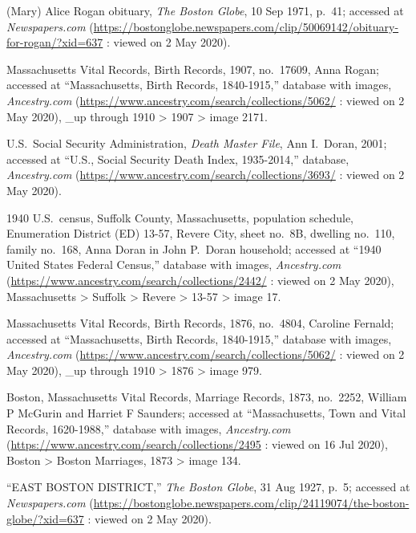 \begin{thebibliography}{999}
	(Mary) Alice Rogan obituary, \textit{The Boston Globe}, 10 Sep 1971, p.\ 41; accessed at \textit{Newspapers.com} (\url{https://bostonglobe.newspapers.com/clip/50069142/obituary-for-rogan/?xid=637} : viewed on 2 May 2020).
	
	Massachusetts Vital Records, Birth Records, 1907, no.\ 17609, Anna Rogan; accessed at ``Massachusetts, Birth Records, 1840-1915,'' database with images, \textit{Ancestry.com} (\url{https://www.ancestry.com/search/collections/5062/} : viewed on 2 May 2020), \_up through 1910 > 1907 > image 2171.
	
	U.S.\ Social Security Administration, \textit{Death Master File}, Ann I.\ Doran, 2001; accessed at ``U.S., Social Security Death Index, 1935-2014,'' database, \textit{Ancestry.com} (\url{https://www.ancestry.com/search/collections/3693/} : viewed on 2 May 2020).
	
	1940 U.S.\ census, Suffolk County, Massachusetts, population schedule, Enumeration District (ED) 13-57, Revere City, sheet no.\ 8B, dwelling no.\ 110, family no.\ 168, Anna Doran in John P.\ Doran household; accessed at ``1940 United States Federal Census,'' database with images, \textit{Ancestry.com} (\url{https://www.ancestry.com/search/collections/2442/} : viewed on 2 May 2020), Massachusetts > Suffolk > Revere > 13-57 > image 17.	
	
	Massachusetts Vital Records, Birth Records, 1876, no.\ 4804, Caroline Fernald; accessed at ``Massachusetts, Birth Records, 1840-1915,'' database with images, \textit{Ancestry.com} (\url{https://www.ancestry.com/search/collections/5062/} : viewed on 2 May 2020), \_up through 1910 > 1876 > image 979.
	
	Boston, Massachusetts Vital Records, Marriage Records, 1873, no.\ 2252, William P McGurin and Harriet F Saunders; accessed at ``Massachusetts, Town and Vital Records, 1620-1988,'' database with images, \textit{Ancestry.com} (\url{https://www.ancestry.com/search/collections/2495} : viewed on 16 Jul 2020), Boston > Boston Marriages, 1873 > image 134.
	
	``EAST BOSTON DISTRICT,'' \textit{The Boston Globe}, 31 Aug 1927, p.\ 5; accessed at \textit{Newspapers.com} (\url{https://bostonglobe.newspapers.com/clip/24119074/the-boston-globe/?xid=637} : viewed on 2 May 2020).	
	

\end{thebibliography}
